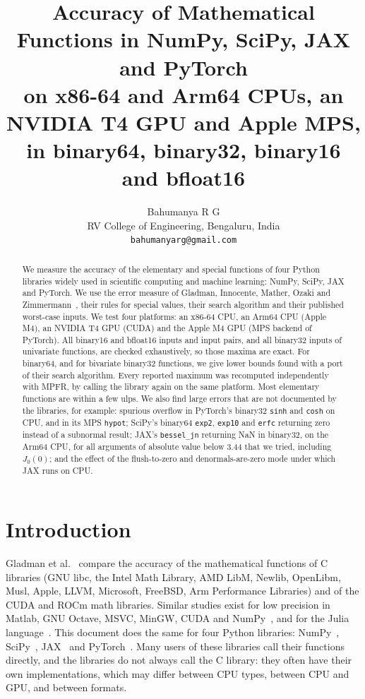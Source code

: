 \documentclass[11pt,a4paper]{article}
\title{Accuracy of Mathematical Functions in NumPy, SciPy, JAX and PyTorch\\
\large on x86-64 and Arm64 CPUs, an NVIDIA T4 GPU and Apple MPS,\\
in binary64, binary32, binary16 and bfloat16}
\author{Bahumanya R G\\ RV College of Engineering, Bengaluru, India\\ \texttt{bahumanyarg@gmail.com}}
\date{}
\begin{document}
\maketitle

\begin{abstract}
We measure the accuracy of the elementary and special functions of four Python libraries widely used in scientific computing and machine learning: NumPy, SciPy, JAX and PyTorch. We use the error measure of Gladman, Innocente, Mather, Ozaki and Zimmermann~\cite{GIMOZ2026}, their rules for special values, their search algorithm and their published worst-case inputs. We test four platforms: an x86-64 CPU, an Arm64 CPU (Apple M4), an NVIDIA T4 GPU (CUDA) and the Apple M4 GPU (MPS backend of PyTorch). All binary16 and bfloat16 inputs and input pairs, and all binary32 inputs of univariate functions, are checked exhaustively, so those maxima are exact. For binary64, and for bivariate binary32 functions, we give lower bounds found with a port of their search algorithm. Every reported maximum was recomputed independently with MPFR, by calling the library again on the same platform. Most elementary functions are within a few ulps. We also find large errors that are not documented by the libraries, for example: spurious overflow in PyTorch's binary32 \texttt{sinh} and \texttt{cosh} on CPU, and in its MPS \texttt{hypot}; SciPy's binary64 \texttt{exp2}, \texttt{exp10} and \texttt{erfc} returning zero instead of a subnormal result; JAX's \texttt{bessel\_jn} returning NaN in binary32, on the Arm64 CPU, for all arguments of absolute value below 3.44 that we tried, including $J_0(0)$; and the effect of the flush-to-zero and denormals-are-zero mode under which JAX runs on CPU.
\end{abstract}

\section{Introduction}

Gladman et al.~\cite{GIMOZ2026} compare the accuracy of the mathematical functions of C libraries (GNU libc, the Intel Math Library, AMD LibM, Newlib, OpenLibm, Musl, Apple, LLVM, Microsoft, FreeBSD, Arm Performance Libraries) and of the CUDA and ROCm math libraries. Similar studies exist for low precision in Matlab, GNU Octave, MSVC, MinGW, CUDA and NumPy~\cite{Ozaki2025}, and for the Julia language~\cite{MGR2025}. This document does the same for four Python libraries: NumPy~\cite{NumPy2020}, SciPy~\cite{SciPy2020}, JAX~\cite{JAX2018} and PyTorch~\cite{PyTorch2024}. Many users of these libraries call their functions directly, and the libraries do not always call the C library: they often have their own implementations, which may differ between CPU types, between CPU and GPU, and between formats.
\end{document}

